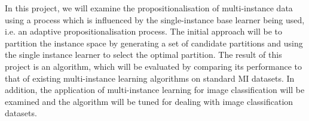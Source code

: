 \documentclass[a4paper,12pt]{article} %
\begin{document}
In this project, we will examine the propositionalisation of multi-instance data using a process which is influenced by the single-instance base learner being used, i.e. an adaptive propositionalisation process. The initial approach will be to partition the instance space by generating a set of candidate partitions and using the single instance learner to select the optimal partition. 
The result of this project is an algorithm, which will be evaluated by comparing its performance to that of existing multi-instance learning algorithms on standard MI datasets. 
In addition, the application of multi-instance learning for image classification will be examined and the algorithm will be tuned for dealing with image classification datasets.
\clearpage
 

\end{document}
